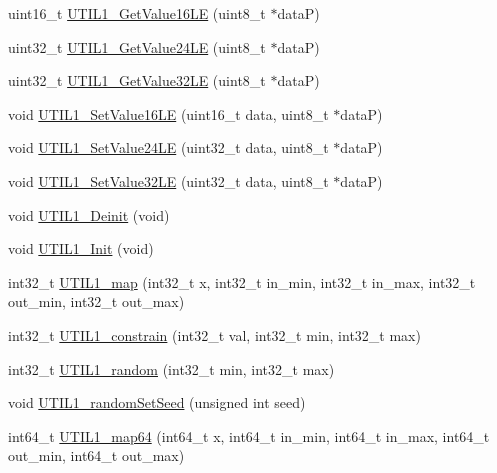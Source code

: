 \begin{DoxyCompactItemize}
\item 
uint16\+\_\+t \hyperlink{group___u_t_i_l1__module_ga7283500379515f46dbe4f529cc316341}{U\+T\+I\+L1\+\_\+\+Get\+Value16\+LE} (uint8\+\_\+t $\ast$dataP)
\item 
uint32\+\_\+t \hyperlink{group___u_t_i_l1__module_gac0b3ad93af2742b85d4345b929965dd7}{U\+T\+I\+L1\+\_\+\+Get\+Value24\+LE} (uint8\+\_\+t $\ast$dataP)
\item 
uint32\+\_\+t \hyperlink{group___u_t_i_l1__module_gae4ad666fee10d82cbef3fc635311a41c}{U\+T\+I\+L1\+\_\+\+Get\+Value32\+LE} (uint8\+\_\+t $\ast$dataP)
\item 
void \hyperlink{group___u_t_i_l1__module_gade9930ffbf6cbfd4b056407f2a4a2622}{U\+T\+I\+L1\+\_\+\+Set\+Value16\+LE} (uint16\+\_\+t data, uint8\+\_\+t $\ast$dataP)
\item 
void \hyperlink{group___u_t_i_l1__module_ga61e5a3fae499bb56b6cc4243d1af58ad}{U\+T\+I\+L1\+\_\+\+Set\+Value24\+LE} (uint32\+\_\+t data, uint8\+\_\+t $\ast$dataP)
\item 
void \hyperlink{group___u_t_i_l1__module_gaa1b34a098db004a5c29cac2b94ab5881}{U\+T\+I\+L1\+\_\+\+Set\+Value32\+LE} (uint32\+\_\+t data, uint8\+\_\+t $\ast$dataP)
\item 
void \hyperlink{group___u_t_i_l1__module_ga9f87fcb2c95a4043e5fa57bc77cb6948}{U\+T\+I\+L1\+\_\+\+Deinit} (void)
\item 
void \hyperlink{group___u_t_i_l1__module_gafca4e760ffbac286078038d7be03dd03}{U\+T\+I\+L1\+\_\+\+Init} (void)
\item 
int32\+\_\+t \hyperlink{group___u_t_i_l1__module_ga5b81fec3e878c92fd4d280819de6be0d}{U\+T\+I\+L1\+\_\+map} (int32\+\_\+t x, int32\+\_\+t in\+\_\+min, int32\+\_\+t in\+\_\+max, int32\+\_\+t out\+\_\+min, int32\+\_\+t out\+\_\+max)
\item 
int32\+\_\+t \hyperlink{group___u_t_i_l1__module_ga6e909658d884ed9b7ef5c20cc08a3df0}{U\+T\+I\+L1\+\_\+constrain} (int32\+\_\+t val, int32\+\_\+t min, int32\+\_\+t max)
\item 
int32\+\_\+t \hyperlink{group___u_t_i_l1__module_ga923c3360e2382292bd19a815882d164d}{U\+T\+I\+L1\+\_\+random} (int32\+\_\+t min, int32\+\_\+t max)
\item 
void \hyperlink{group___u_t_i_l1__module_ga678ad62b1a72d2521a11e1bd7526089d}{U\+T\+I\+L1\+\_\+random\+Set\+Seed} (unsigned int seed)
\item 
int64\+\_\+t \hyperlink{group___u_t_i_l1__module_gacca9daae354a4e07da3dec67ae084463}{U\+T\+I\+L1\+\_\+map64} (int64\+\_\+t x, int64\+\_\+t in\+\_\+min, int64\+\_\+t in\+\_\+max, int64\+\_\+t out\+\_\+min, int64\+\_\+t out\+\_\+max)
\end{DoxyCompactItemize}


